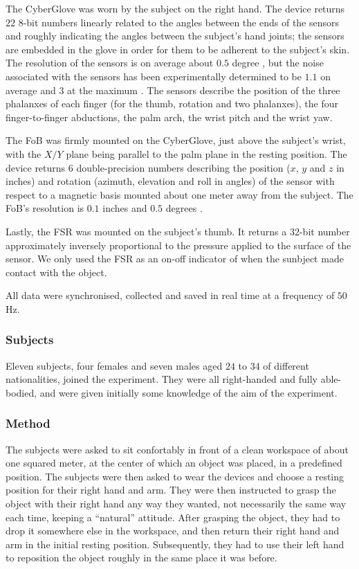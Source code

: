 The CyberGlove was worn by the subject on the right hand. The device
returns $22$ $8$-bit numbers linearly related to the angles between
the ends of the sensors and roughly indicating the angles between the
subject's hand joints; the sensors are embedded in the glove in order
for them to be adherent to the subject's skin. The resolution of the
sensors is on average about $0.5$ degree \cite{cyberglove}, but the
noise associated with the sensors has been experimentally determined
to be $1.1$ on average and $3$ at the maximum \cite{212431}. The
sensors describe the position of the three phalanxes of each finger
(for the thumb, rotation and two phalanxes), the four finger-to-finger
abductions, the palm arch, the wrist pitch and the wrist yaw.

The FoB was firmly mounted on the CyberGlove, just above the subject's
wrist, with the $X/Y$ plane being parallel to the palm plane in the
resting position. The device returns $6$ double-precision numbers
describing the position ($x$, $y$ and $z$ in inches) and rotation
(azimuth, elevation and roll in angles) of the sensor with respect to
a magnetic basis mounted about one meter away from the subject. The
FoB's resolution is $0.1$ inches and $0.5$ degrees \cite{fob}.

Lastly, the FSR was mounted on the subject's thumb. It returns a
$32$-bit number approximately inversely proportional to the pressure
applied to the surface of the sensor. We only used the FSR as an
on-off indicator of when the sunbject made contact with the object.

All data were synchronised, collected and saved in real time at a
frequency of $50$Hz.

\subsubsection*{Subjects}

Eleven subjects, four females and seven males aged $24$ to $34$ of
different nationalities, joined the experiment. They were all
right-handed and fully able-bodied, and were given initially some
knowledge of the aim of the experiment.

\subsubsection*{Method}

The subjects were asked to sit confortably in front of a clean
workspace of about one squared meter, at the center of which an object
was placed, in a predefined position. The subjects were then asked to
wear the devices and choose a resting position for their right hand
and arm. They were then instructed to grasp the object with their
right hand any way they wanted, not necessarily the same way each
time, keeping a ``natural'' attitude. After grasping the object, they
had to drop it somewhere else in the workspace, and then return their
right hand and arm in the initial resting position. Subsequently, they
had to use their left hand to reposition the object roughly in the
same place it was before.

